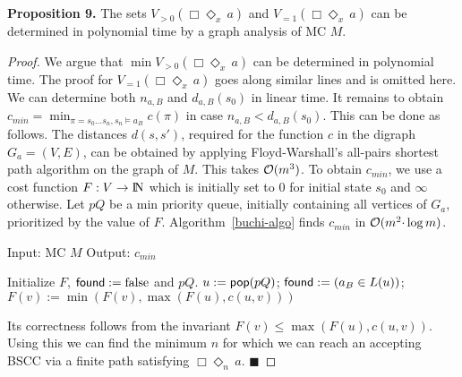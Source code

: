 \documentclass{llncs}
\newcommand{\false}{\mbox{false}}
\newcommand{\Nats}{\mbox{${\rm I\!N}$}}
\renewcommand{\leq}{\leqslant}
\renewcommand{\emptyset}{\varnothing}
\newcommand{\de}{\Diamond}
\begin{document}
\section{}
\textbf{Proposition 9.}
The sets $V_{>0}(\Box \de_{x} \, a)$ and $V_{=1}(\Box \de_{x} \, a)$ can be determined in polynomial time by a graph analysis of MC $M$.
\begin{proof} 
We argue that $\min V_{>0}(\Box\de_x \, a)$ can be determined in polynomial time.
The proof for $V_{=1}(\Box \de_x \, a)$ goes along similar lines and is omitted here.
We can determine both $n_{a,B}$ and $d_{a,B}(s_0)$ in linear time.
It remains to obtain $c_{min} = \min_{\pi = s_0 \ldots s_n, s_n \models a_B} c(\pi)$ in case $n_{a,B} < d_{a,B}(s_0)$.
This can be done as follows.
The distances $d(s,s')$, required for the function $c$ in the digraph $G_a = (V,E)$, can be obtained by applying Floyd-Warshall's all-pairs shortest path algorithm on the graph of $M$.
This takes ${\cal O}(m^3)$.
To obtain $c_{min}$, we use a cost function $F: V \to \Nats$ which is initially set to $0$ for initial state $s_0$ and $\infty$ otherwise.
Let $pQ$  be a min priority queue, initially containing all vertices of $G_a$, prioritized by the value of $F$. Algorithm~\ref{buchi-algo} finds 
$c_{min}$ in ${\cal O}(m^2{\cdot}\log m)$.
\begin{algorithm}
{\small
 \caption{Input: MC $M$  Output: $c_{min}$}\label{buchi-algo}
  \begin{algorithmic}[1]
    \State Initialize $F$, $\mbox{\sf found} := \false$ and $pQ$.
    \While{ $\left( \neg \mbox{\sf found} \mbox{ and } pQ \neq \emptyset \right)$}
      \State $u := \mbox{\sf pop}(pQ)$;  $\mbox{\sf found} := (a_B \in L(u))$;
       $F(v):= \min \left(F(v),\max(F(u),c(u,v)) \right)$ \EndFor
    \EndWhile
  \end{algorithmic}
}
\end{algorithm}
Its correctness follows from the invariant $F(v) \leq \max(F(u),c(u,v))$. 
Using this we can find the minimum $n$ for which we can reach an accepting BSCC via a finite path satisfying $\Box\de_n \, a$. 
 \hfill $\blacksquare$
\end{proof}
\end{document}
